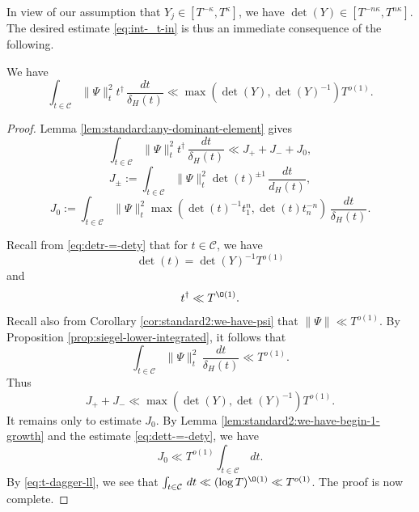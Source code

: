 In view of our assumption that $Y_j \in [T^{-\kappa}, T^{\kappa}]$, we have $\det(Y) \in [T^{- n \kappa}, T^{n \kappa}]$.  The desired estimate \eqref{eq:int-_t-in} is thus an immediate consequence of the following.
\begin{proposition}
  We have
  \begin{equation*}
    \int_{t \in \mathcal{C} } \|\Psi\|_t^2 t^\dagger \, \frac{d t}{\delta_H(t)}
    \ll
    \max(\det(Y), \det(Y)^{-1}) T^{o(1)}.
  \end{equation*}
\end{proposition}
\begin{proof}
  Lemma \ref{lem:standard:any-dominant-element} gives
  \begin{equation*}
    \int_{t \in \mathcal{C} } \|\Psi\|_t^2 t^\dagger \, \frac{d t}{\delta_H(t)} \ll
    J_+ + J_- + J_0,
  \end{equation*}
  \begin{equation*}
    J_{\pm} := \int_{t \in \mathcal{C} } \|\Psi\|_t^2 \det(t)^{\pm 1} \, \frac{d t}{d_H(t)},
  \end{equation*}
  \begin{equation*}
    J_0 := \int_{t \in \mathcal{C} } \|\Psi\|_t^2 \max(\det(t)^{-1} t_1^n, \det(t) t_n^{-n}) \, \frac{d t}{ \delta_H(t) }.
  \end{equation*}

  Recall from \eqref{eq:detr-=-dety} that for $t \in \mathcal{C}$, we have
  \begin{equation}\label{eq:dett-=-dety}
    \det(t) = \det(Y)^{-1} T^{o(1)}
  \end{equation}
  and
  \begin{equation}\label{eq:t-dagger-ll}
    t^\dagger \ll T^{\O(1)}.
  \end{equation}
  Recall also from Corollary \ref{cor:standard2:we-have-psi}  that $\|\Psi\| \ll T^{o(1)}$.  By Proposition \ref{prop:siegel-lower-integrated}, it follows that
  \begin{equation*}
    \int_{t \in \mathcal{C} } \|\Psi\|_t^2 \, \frac{d t}{ \delta_H(t) } \ll T^{o(1)}.
  \end{equation*}
  Thus
  \begin{equation*}
    J_+ + J_- \ll
    \max(\det(Y), \det(Y)^{-1}) T^{o(1)}.
  \end{equation*}
  It remains only to estimate $J_0$.  By Lemma \ref{lem:standard2:we-have-begin-1-growth} and the estimate \eqref{eq:dett-=-dety}, we have
  \begin{equation*}
    J_0 \ll T^{o(1)} \int_{t \in \mathcal{C}} \, d t.
  \end{equation*}
  By \eqref{eq:t-dagger-ll}, we see that $\int_{t \in \mathcal{C}} \, d t \ll (\log T)^{\O(1)} \ll T^{o(1)}$.  The proof is now complete.
\end{proof}


